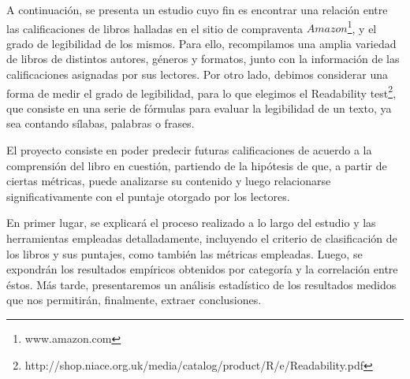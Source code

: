 \documentclass[12pt,journal,compsoc]{IEEEtran}
\begin{document}
A continuación, se presenta un estudio cuyo fin es encontrar una relación entre las calificaciones de libros halladas en el sitio de compraventa $Amazon$\footnote{www.amazon.com}, y el grado de legibilidad de los mismos. Para ello, recompilamos una amplia variedad de libros de distintos autores, géneros y formatos, junto con la información de las calificaciones asignadas por sus lectores. Por otro lado, debimos considerar una forma de medir el grado de legibilidad, para lo que elegimos el Readability test\footnote{http://shop.niace.org.uk/media/catalog/product/R/e/Readability.pdf}, que consiste en una serie de fórmulas para evaluar la legibilidad de un texto, ya sea contando sílabas, palabras o frases.

El proyecto consiste en poder predecir futuras calificaciones de acuerdo a la comprensión del libro en cuestión, partiendo de la hipótesis de que, a partir de ciertas métricas, puede analizarse su contenido y luego relacionarse significativamente con el puntaje otorgado por los lectores.

En primer lugar, se explicará el proceso realizado a lo largo del estudio y las herramientas empleadas detalladamente, incluyendo el criterio de clasificación de los libros y sus puntajes, como también las métricas empleadas. Luego, se expondrán los resultados empíricos obtenidos por categoría y la correlación entre éstos. Más tarde, presentaremos un análisis estadístico de los resultados medidos que nos permitirán, finalmente, extraer conclusiones.
\end{document}
